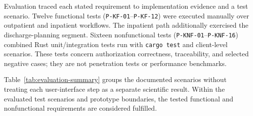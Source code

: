 Evaluation traced each stated requirement to implementation evidence and a test scenario. Twelve functional tests (\texttt{P-KF-01}--\texttt{P-KF-12}) were executed manually over outpatient and inpatient workflows. The inpatient path additionally exercised the discharge-planning segment. Sixteen nonfunctional tests (\texttt{P-KNF-01}--\texttt{P-KNF-16}) combined Rust unit/integration tests run with \texttt{cargo test} and client-level scenarios. These tests concern authorization correctness, traceability, and selected negative cases; they are not penetration tests or performance benchmarks.

Table~\ref{tab:evaluation-summary} groups the documented scenarios without treating each user-interface step as a separate scientific result. Within the evaluated test scenarios and prototype boundaries, the tested functional and nonfunctional requirements are considered fulfilled.

